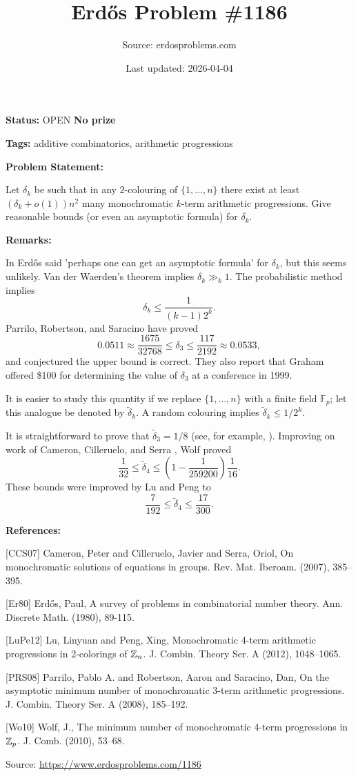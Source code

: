\documentclass{article}
\title{Erd\H{o}s Problem \#1186}
\date{Last updated: 2026-04-04}
\author{Source: erdosproblems.com}
\begin{document}
\maketitle

\noindent\textbf{Status:} OPEN \quad \textbf{No prize}

\noindent\textbf{Tags:} additive combinatorics, arithmetic progressions

\medskip
\noindent\textbf{Problem Statement:}

Let $\delta_k$ be such that in any $2$-colouring of $\{1,\ldots,n\}$ there exist at least $(\delta_k+o(1))n^2$ many monochromatic $k$-term arithmetic progressions. Give reasonable bounds (or even an asymptotic formula) for $\delta_k$.

\bigskip
\noindent\textbf{Remarks:}

In \cite{Er80} Erd\H{o}s said 'perhaps one can get an asymptotic formula' for $\delta_k$, but this seems unlikely. Van der Waerden's theorem implies $\delta_k\gg_k 1$. The probabilistic method implies\[\delta_k \leq \frac{1}{(k-1)2^{k}}.\]Parrilo, Robertson, and Saracino \cite{PRS08} have proved\[0.0511\approx \frac{1675}{32768}\leq \delta_3 \leq \frac{117}{2192}\approx 0.0533,\]and conjectured the upper bound is correct. They also report that Graham offered \$100 for determining the value of $\delta_3$ at a conference in 1999.

It is easier to study this quantity if we replace $\{1,\ldots,n\}$ with a finite field $\mathbb{F}_p$; let this analogue be denoted by $\tilde{\delta}_k$. A random colouring implies $\tilde{\delta}_k\leq 1/2^{k}$.

It is straightforward to prove that $\tilde{\delta}_3=1/8$ (see, for example, \cite{Wo10}). Improving on work of Cameron, Cilleruelo, and Serra \cite{CCS07}, Wolf \cite{Wo10} proved\[\frac{1}{32}\leq \tilde{\delta}_4\leq \left(1-\frac{1}{259200}\right)\frac{1}{16}.\]These bounds were improved by Lu and Peng \cite{LuPe12} to\[\frac{7}{192}\leq \tilde{\delta}_4\leq \frac{17}{300}.\]

\bigskip
\noindent\textbf{References:}

[CCS07] Cameron, Peter and Cilleruelo, Javier and Serra, Oriol, On monochromatic solutions of equations in groups. Rev. Mat. Iberoam. (2007), 385--395.
 
 [Er80] Erd\H{o}s, Paul, A survey of problems in combinatorial number theory. Ann. Discrete Math. (1980), 89-115.
 
 [LuPe12] Lu, Linyuan and Peng, Xing, Monochromatic 4-term arithmetic progressions in 2-colorings of
{$\Bbb Z_n$}. J. Combin. Theory Ser. A (2012), 1048--1065.
 
 [PRS08] Parrilo, Pablo A. and Robertson, Aaron and Saracino, Dan, On the asymptotic minimum number of monochromatic 3-term
arithmetic progressions. J. Combin. Theory Ser. A (2008), 185--192.
 
 [Wo10] Wolf, J., The minimum number of monochromatic 4-term progressions in
{$\Bbb Z_p$}. J. Comb. (2010), 53--68.

\bigskip
\noindent\small{Source: \url{https://www.erdosproblems.com/1186}}
\end{document}
